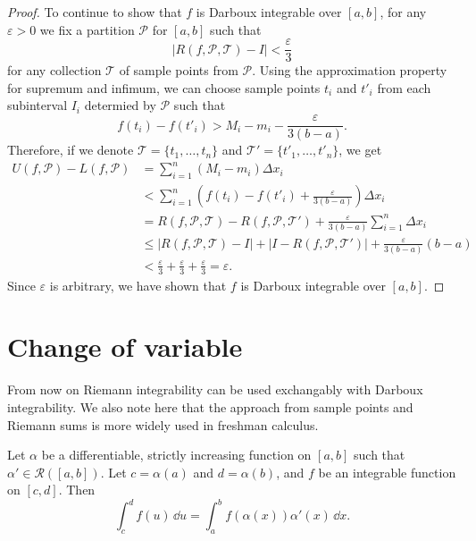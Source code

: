 \begin{proof}
  To continue to show that $f$ is Darboux integrable over $[a,b]$, for any $\varepsilon > 0$ we fix a partition $\mathcal{P}$ for $[a,b]$ such that
  \[
    | R(f,\mathcal{P},\mathcal{T}) - I | < \frac{\varepsilon}{3}
  \]
  for any collection $\mathcal{T}$ of sample points from $\mathcal{P}$.
  Using the approximation property for supremum and infimum, we can choose sample points $t_i$ and $t'_i$ from each subinterval $I_i$ determied by $\mathcal{P}$ such that
  \[
    f(t_i) - f(t'_i) > M_i - m_i - \frac{\varepsilon}{3 (b-a)}.
  \]
  Therefore, if we denote $\mathcal{T} = \{ t_1, \dots, t_n \}$ and $\mathcal{T}' = \{ t'_1, \dots, t'_n \}$, we get
  \begin{align*}
    U(f,\mathcal{P}) - L(f,\mathcal{P}) &= \sum_{i=1}^n (M_i - m_i) \Delta x_i \\
    &< \sum_{i=1}^n \left( f(t_i) - f(t'_i) + \frac{\varepsilon}{3(b-a)} \right) \Delta x_i \\
    &= R(f,\mathcal{P},\mathcal{T}) - R(f,\mathcal{P},\mathcal{T}') + \frac{\varepsilon}{3(b-a)} \sum_{i=1}^n \Delta x_i \\
    &\leqslant | R(f,\mathcal{P},\mathcal{T}) - I | + | I - R(f,\mathcal{P},\mathcal{T}') | + \frac{\varepsilon}{3(b-a)} (b-a) \\ &< \frac{\varepsilon}{3} + \frac{\varepsilon}{3} + \frac{\varepsilon}{3} = \varepsilon.
  \end{align*}
  Since $\varepsilon$ is arbitrary, we have shown that $f$ is Darboux integrable over $[a,b]$.
\end{proof}

\section{Change of variable}
\label{sec:change-of-variable}

From now on Riemann integrability can be used exchangably with Darboux integrability.
We also note here that the approach from sample points and Riemann sums is more widely used in freshman calculus.

\begin{thm}
  Let $\alpha$ be a differentiable, strictly increasing function on $[a,b]$ such that $\alpha' \in \mathcal{R}([a,b])$.  Let $c = \alpha(a)$ and $d = \alpha(b)$, and $f$ be an integrable function on $[c,d]$.
  Then
  \[
    \int_c^d f(u) \, \dd u = \int_a^b f(\alpha(x)) \alpha'(x) \, \dd x.
  \]
\end{thm}

